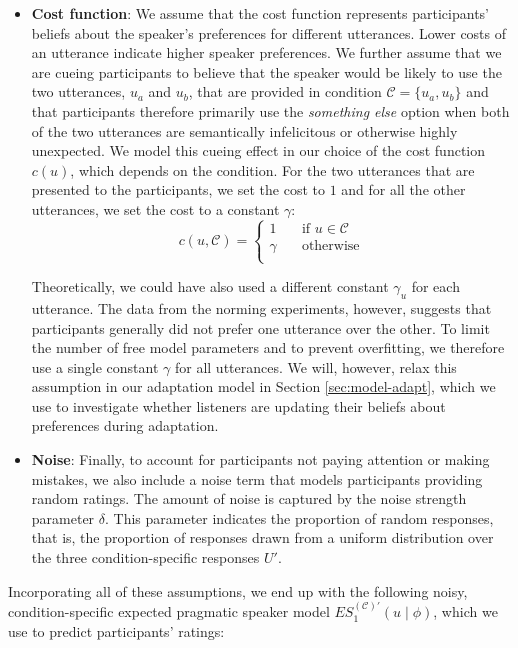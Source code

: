 \documentclass[lucida,biblatex]{sp} %
\newcommand{\sectionref}[1]{Section \ref{#1}}
\begin{document}
\begin{itemize}
\item \textbf{Cost function}: We assume that the cost function represents participants' beliefs about the speaker's 
preferences for different utterances. Lower costs of an utterance indicate higher speaker preferences. We further 
assume that we are cueing participants to believe that the speaker would be likely to use the two utterances, $u_a$ 
and $u_b$, that are provided in condition $\mathscr{C}=\{u_a, u_b\}$ and that participants therefore primarily use the 
\textit{something else} option when both of the two utterances are semantically infelicitous or otherwise highly unexpected. 
We model this cueing effect in our choice of the cost function $c(u)$, which depends on the condition. For the two utterances 
that are presented to the participants, we set the cost to $1$ and for all the other utterances, we set the cost to a constant $\gamma$:
$$
c(u, \mathscr{C}) = 
     \begin{cases}
       1 &\quad\text{if } u  \in \mathscr{C}\\
       \gamma &\quad\text{otherwise} \\
     \end{cases}
$$

Theoretically, we could have also used a different constant $\gamma_u$ for each utterance. The data from
the norming experiments, however, suggests that participants generally did not prefer one utterance over 
the other. To limit the number of free model parameters and to prevent overfitting, we therefore use a single
constant $\gamma$ for all utterances. We will, however, relax this assumption in our adaptation model in \sectionref{sec:model-adapt}, which
we use to investigate whether listeners are updating their beliefs about preferences during adaptation.

\item \textbf{Noise}: Finally, to account for participants not paying attention or making mistakes, 
we also include a noise term that models participants providing random ratings.
The amount of noise is captured by the noise strength parameter $\delta$. This parameter
indicates the proportion of random responses, that is, the proportion of responses drawn from a uniform distribution
over the three condition-specific responses $U'$. 

\end{itemize}

\noindent Incorporating all of these assumptions, we end up with the following noisy, condition-specific expected pragmatic speaker 
model $ES_1^{(\mathscr{C})'}(u \mid \phi)$, which we use to predict participants' ratings:
\end{document}
